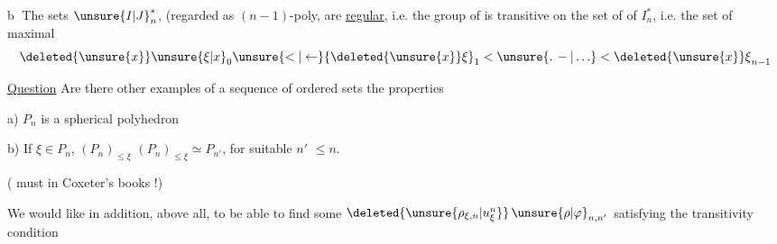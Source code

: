\textcircled{b} The  sets $ {\unsure{I|J}}_n^*$, (regarded as $(n-1)$-poly, are \uline{regular}, i.e. the group of  is transitive on the set of  of $I_n^*$, i.e. the set of maximal 
\[
{\deleted{\unsure{x}}\unsure{\xi|x}}_0\unsure{<|\leftarrow}{\deleted{\unsure{x}}\xi}_1<\unsure{.\,-|\ldots}<{\deleted{\unsure{x}}\xi}_{n-1}
\]

\uline{Question} Are there other examples of a sequence    of ordered sets  the properties

a) $P_n$ is a \uline{} spherical polyhedron

b) If $\xi\in P_n$,   $(P_n)_{\leq\xi}$  $(P_n)_{\leq\xi}\simeq P_{n'}$, for suitable $n'$ $\leq n$.

( must  in Coxeter's books !)

We would like in addition, above all, to be able to find some $\deleted{\unsure{\rho_{\xi,n}|u^n_\xi}}\,{\unsure{\rho|\varphi}}_{n,n'}$ satisfying the transitivity condition
